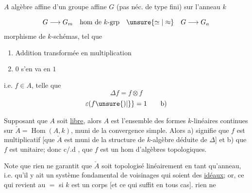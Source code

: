 
$A$ algèbre affine d'un groupe affine $G$ (pas néc. de type fini) sur l'anneau $k$

\[G\longrightarrow G_m\quad\text{hom de $k$-grp}\quad\unsure{\simeq|\approx}\quad G\longrightarrow G_a\]
morphisme de $k$-schémas, tel que
\begin{enumerate}[label=(\roman*)]
\item Addition transformée en multiplication
\item $0$ s'en va en $1$
\end{enumerate}

i.e. $f\in A$, telle que
\[\Delta f=f\otimes f\tag*{a)}\]
\[\varepsilon(f\unsure{)|\}}=1\tag*{b)}\]

Supposant que $A$ soit \uline{libre}, alors $A$ est l'ensemble des formes $k$-linéaires continues sur $\check A=\operatorname{Hom}(A,k)$, muni de la convergence simple. Alors a) signifie que $f$ est multiplicatif  [que $\check A$ est muni de la structure de $k$-algèbre déduite de $\Delta$] et b) que $f$ est unitaire; donc c/.d , que $f$ est un hom d'algèbres topologiques.

 Note que rien ne garantit que $\check A$ soit topologisé linéairement en tant qu'anneau, i.e. qu'il y ait un système fondamental de voisinages qui soient des \uline{idéaux}; or, ce qui revient au $=$ si $k$ est un corps [et ce qui suffit en tous cas]. rien ne
